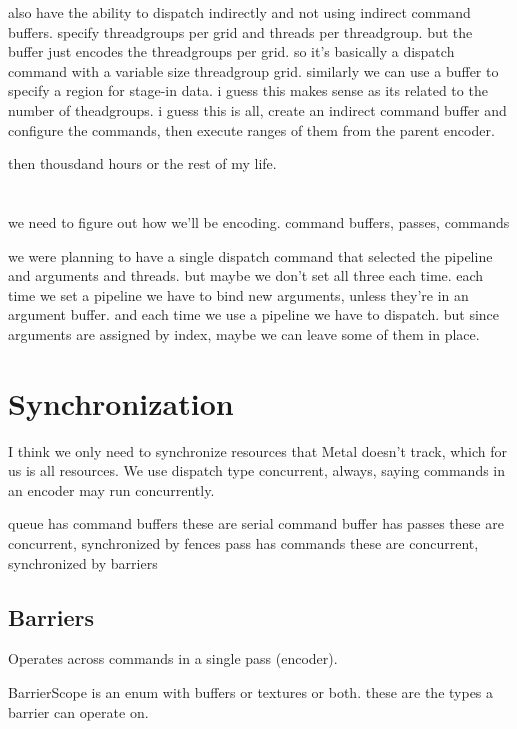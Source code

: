 also have the ability to dispatch indirectly and not using indirect command buffers.
specify threadgroups per grid and threads per threadgroup. but the buffer just encodes the threadgroups per grid. 
so it's basically a dispatch command with a variable size threadgroup grid. 
similarly we can use a buffer to specify a region for stage-in data. i guess this makes sense as its related to the number of theadgroups.
i guess this is all, create an indirect command buffer and configure the commands, then execute ranges of them from the parent encoder.

then thousdand hours or the rest of my life. 



\section{}

we need to figure out how we'll be encoding.
command buffers, passes, commands

we were planning to have a single dispatch command that selected the pipeline and arguments and threads. but maybe we don't set all three each time.
each time we set a pipeline we have to bind new arguments, unless they're in an argument buffer.
and each time we use a pipeline we have to dispatch. 
but since arguments are assigned by index, maybe we can leave some of them in place.


\section{Synchronization}

I think we only need to synchronize resources that Metal doesn't track, which for us is all resources.
We use dispatch type concurrent, always, saying commands in an encoder may run concurrently.

queue has command buffers
    these are serial
command buffer has passes
    these are concurrent, synchronized by fences
pass has commands
    these are concurrent, synchronized by barriers

\subsection{Barriers}

Operates across commands in a single pass (encoder).

BarrierScope is an enum with buffers or textures or both.
these are the types a barrier can operate on. 


